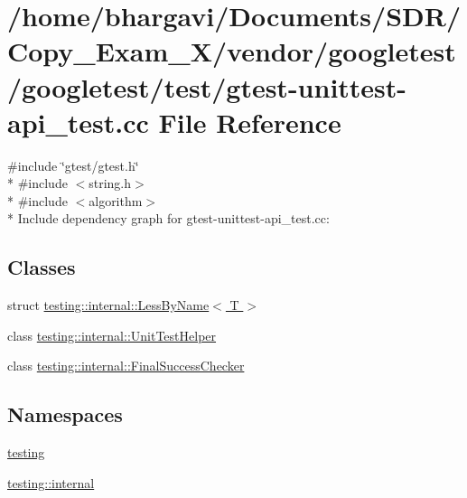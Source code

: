 \hypertarget{gtest-unittest-api__test_8cc}{}\section{/home/bhargavi/\+Documents/\+S\+D\+R/\+Copy\+\_\+\+Exam\+\_\+X/vendor/googletest/googletest/test/gtest-\/unittest-\/api\+\_\+test.cc File Reference}
\label{gtest-unittest-api__test_8cc}
{\ttfamily \#include \char`\"{}gtest/gtest.\+h\char`\"{}}\\*
{\ttfamily \#include $<$string.\+h$>$}\\*
{\ttfamily \#include $<$algorithm$>$}\\*
Include dependency graph for gtest-\/unittest-\/api\+\_\+test.cc\+:
\subsection*{Classes}
\begin{DoxyCompactItemize}
\item 
struct \hyperlink{structtesting_1_1internal_1_1_less_by_name}{testing\+::internal\+::\+Less\+By\+Name$<$ T $>$}
\item 
class \hyperlink{classtesting_1_1internal_1_1_unit_test_helper}{testing\+::internal\+::\+Unit\+Test\+Helper}
\item 
class \hyperlink{classtesting_1_1internal_1_1_final_success_checker}{testing\+::internal\+::\+Final\+Success\+Checker}
\end{DoxyCompactItemize}
\subsection*{Namespaces}
\begin{DoxyCompactItemize}
\item 
 \hyperlink{namespacetesting}{testing}
\item 
 \hyperlink{namespacetesting_1_1internal}{testing\+::internal}
\end{DoxyCompactItemize}
